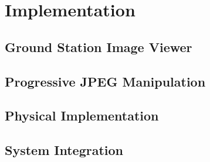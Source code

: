 \chapter{Implementation}






\section{Ground Station Image Viewer}

\section{Progressive JPEG Manipulation}

\section{Physical Implementation}

\section{System Integration}

